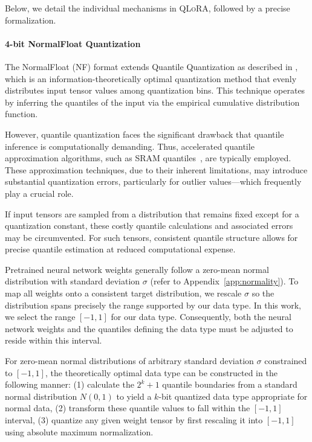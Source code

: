 Below, we detail the individual mechanisms in \textsc{QLoRA}, followed by a precise formalization.

\paragraph{4-bit NormalFloat Quantization} The NormalFloat (NF) format extends Quantile Quantization as described in \citep{dettmers2022optimizers}, which is an information-theoretically optimal quantization method that evenly distributes input tensor values among quantization bins. This technique operates by inferring the quantiles of the input via the empirical cumulative distribution function.

However, quantile quantization faces the significant drawback that quantile inference is computationally demanding. Thus, accelerated quantile approximation algorithms, such as SRAM quantiles~\citep{dettmers2022optimizers}, are typically employed. These approximation techniques, due to their inherent limitations, may introduce substantial quantization errors, particularly for outlier values—which frequently play a crucial role.

If input tensors are sampled from a distribution that remains fixed except for a quantization constant, these costly quantile calculations and associated errors may be circumvented. For such tensors, consistent quantile structure allows for precise quantile estimation at reduced computational expense.

Pretrained neural network weights generally follow a zero-mean normal distribution with standard deviation $\sigma$ (refer to Appendix~\ref{app:normality}). To map all weights onto a consistent target distribution, we rescale $\sigma$ so the distribution spans precisely the range supported by our data type. In this work, we select the range $[-1, 1]$ for our data type. Consequently, both the neural network weights and the quantiles defining the data type must be adjusted to reside within this interval.

For zero-mean normal distributions of arbitrary standard deviation $\sigma$ constrained to $[-1, 1]$, the theoretically optimal data type can be constructed in the following manner: (1) calculate the $2^k+1$ quantile boundaries from a standard normal distribution $N(0, 1)$ to yield a $k$-bit quantized data type appropriate for normal data, (2) transform these quantile values to fall within the $[-1, 1]$ interval, (3) quantize any given weight tensor by first rescaling it into $[-1, 1]$ using absolute maximum normalization.


